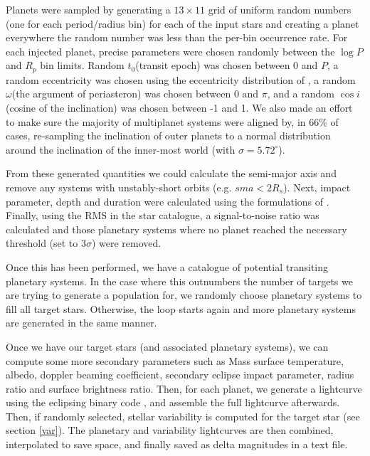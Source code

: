 \documentclass{article}
\begin{document}
Planets were sampled by generating a $13\times11$ grid of uniform random numbers (one for each period/radius bin) for each of the input stars and creating a planet everywhere the random number was less than the per-bin occurrence rate.
For each injected planet, precise parameters were chosen randomly between the $\log{P}$ and $R_p$ bin limits.
Random $t_0$(transit epoch) was chosen between 0 and $P$, a random eccentricity was chosen using the eccentricity distribution of \citet{kipping2013parametrizing}, a random $\omega$(the argument of periasteron) was chosen between 0 and $\pi$, and a random $\cos{i}$ (cosine of the inclination) was chosen between -1 and 1.
We also made an effort to make sure the majority of multiplanet systems were aligned by, in 66\% of cases, re-sampling the inclination of outer planets to a normal distribution around the inclination of the inner-most world (with $\sigma=5.72^\circ$).

From these generated quantities we could calculate the semi-major axis and remove any systems with unstably-short orbits (e.g. $sma < 2R_s$).
Next, impact parameter, depth and duration were calculated using the formulations of \citet{seager2003unique}.
Finally, using the RMS in the star catalogue, a signal-to-noise ratio was calculated and those planetary systems where no planet reached the necessary threshold (set to $3\sigma$) were removed.

Once this has been performed, we have a catalogue of potential transiting planetary systems.
In the case where this outnumbers the number of targets we are trying to generate a population for, we randomly choose planetary systems to fill all target stars. Otherwise, the loop starts again and more planetary systems are generated in the same manner.

Once we have our target stars (and associated planetary systems), we can compute some more secondary parameters such as Mass \citep[using the Mass-Radius relation of][]{weiss2014mass} surface temperature, albedo, doppler beaming coefficient, secondary eclipse impact parameter, radius ratio and surface brightness ratio.
Then, for each planet, we generate a lightcurve using the eclipsing binary code \citet{maxted2016ellc}, and assemble the full lightcurve afterwards.
Then, if randomly selected, stellar variability is computed for the target star (see section \ref{var}).
The planetary and variability lightcurves are then combined, interpolated to save space, and finally saved as delta magnitudes in a text file.
\end{document}
